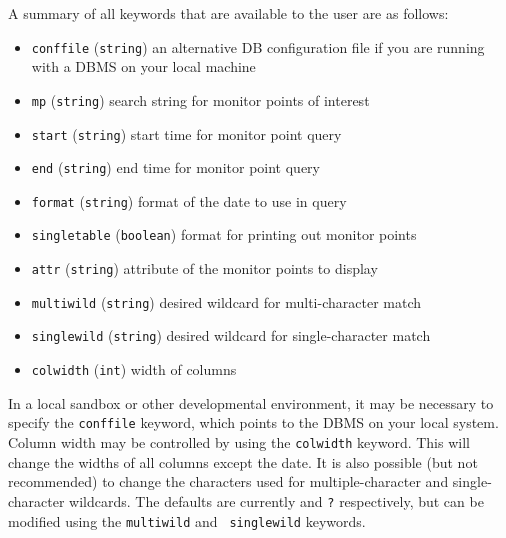 \documentclass[preprint]{aastex}
\begin{document}
A summary of all keywords that are available to the user are as follows:
\begin{itemize}
 \item {{\tt conffile} ({\tt string}) an alternative DB configuration
       file if you are running with a DBMS on your local machine}
 \item{{\tt mp} ({\tt string}) search string for monitor points of
        interest}
 \item{{\tt start} ({\tt string}) start time for monitor point query}
 \item{{\tt end} ({\tt string}) end time for monitor point query}
 \item{{\tt format} ({\tt string}) format of the date to use in query}
 \item{{\tt singletable} ({\tt boolean}) format for printing out monitor points}
 \item{{\tt attr} ({\tt string}) attribute of the monitor points to display}
 \item{{\tt multiwild} ({\tt string}) desired wildcard for
        multi-character match}
 \item{{\tt singlewild} ({\tt string}) desired wildcard for
        single-character match}
 \item{{\tt colwidth} ({\tt int}) width of columns}
\end{itemize}

In a local sandbox or other developmental environment, it may be
necessary to specify the {\tt conffile} keyword, which points to the
DBMS on your local system.  Column width may be controlled by using
the {\tt colwidth} keyword.  This will change the widths of all
columns except the date.  It is also possible (but not recommended) to
change the characters used for multiple-character and single-character
wildcards.  The defaults are currently {\tt *} and {\tt ?}
respectively, but can be modified using the {\tt multiwild} and {\tt
singlewild} keywords.

\appendix
\clearpage
\end{document}
